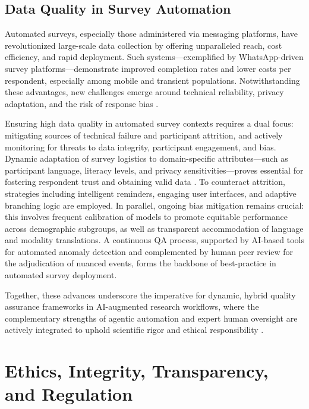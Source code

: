 \documentclass[sigconf]{acmart}
\begin{document}
\subsection{Data Quality in Survey Automation}

Automated surveys, especially those administered via messaging platforms, have revolutionized large-scale data collection by offering unparalleled reach, cost efficiency, and rapid deployment. Such systems—exemplified by WhatsApp-driven survey platforms—demonstrate improved completion rates and lower costs per respondent, especially among mobile and transient populations. Notwithstanding these advantages, new challenges emerge around technical reliability, privacy adaptation, and the risk of response bias \cite{ref117}.

Ensuring high data quality in automated survey contexts requires a dual focus: mitigating sources of technical failure and participant attrition, and actively monitoring for threats to data integrity, participant engagement, and bias. Dynamic adaptation of survey logistics to domain-specific attributes—such as participant language, literacy levels, and privacy sensitivities—proves essential for fostering respondent trust and obtaining valid data \cite{ref117}. To counteract attrition, strategies including intelligent reminders, engaging user interfaces, and adaptive branching logic are employed. In parallel, ongoing bias mitigation remains crucial: this involves frequent calibration of models to promote equitable performance across demographic subgroups, as well as transparent accommodation of language and modality translations. A continuous QA process, supported by AI-based tools for automated anomaly detection and complemented by human peer review for the adjudication of nuanced events, forms the backbone of best-practice in automated survey deployment.

Together, these advances underscore the imperative for dynamic, hybrid quality assurance frameworks in AI-augmented research workflows, where the complementary strengths of agentic automation and expert human oversight are actively integrated to uphold scientific rigor and ethical responsibility \cite{ref88,ref89,ref91,ref92,ref93,ref96,ref97,ref98,ref108,ref112,ref113,ref114,ref115,ref117}.

\section{Ethics, Integrity, Transparency, and Regulation}
\end{document}
